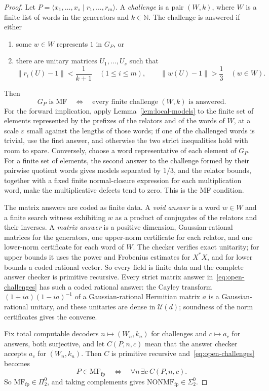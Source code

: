 \documentclass[11pt]{amsart}
\theoremstyle{remark}
\theoremstyle{plain}
\newcommand{\U}{\mathcal U}
\newcommand{\opnorm}[1]{\left\lVert #1\right\rVert}
\begin{document}
\begin{proof}
Let $P=\langle x_1,\dots,x_s\mid r_1,\dots,r_m\rangle$.  A
\emph{challenge} is a pair $(W,k)$, where $W$ is a finite list of words in
the generators and $k\in\mathbb N$.  The challenge is answered if
either
\begin{enumerate}
\item some $w\in W$ represents $1$ in $G_P$, or
\item there are unitary matrices $U_1,\dots,U_s$ such that
\[
  \opnorm{r_i(U)-1}<\frac1{k+1}\quad(1\le i\le m),
  \qquad
  \opnorm{w(U)-1}>\frac13\quad(w\in W).
\]
\end{enumerate}
Then
\begin{equation}\label{eq:open-challenges}
  G_P\text{ is MF}
  \quad\Longleftrightarrow\quad
  \text{every finite challenge $(W,k)$ is answered}.
\end{equation}
For the forward implication, apply Lemma~\ref{lem:local-models} to the
finite set of elements represented by the prefixes of the relators and of
the words of $W$, at a scale $\varepsilon$ small against the lengths of
those words; if one of the challenged words is trivial, use the first
answer, and otherwise the two strict inequalities hold with room to spare.
Conversely, choose a word representative of each element of $G_P$.  For a
finite set of elements, the second answer to the challenge formed by their
pairwise quotient words gives models separated by $1/3$, and the relator
bounds, together with a fixed finite normal-closure expression for each
multiplication word, make the multiplicative defects tend to zero.  This
is the MF condition.

The matrix answers are coded as finite data.  A \emph{void answer} is a
word $w\in W$ and a finite search witness exhibiting $w$ as a product of
conjugates of the relators and their inverses.  A \emph{matrix answer} is
a positive dimension, Gaussian-rational matrices for the generators, one
upper-norm certificate for each relator, and one lower-norm certificate for
each word of $W$.  The checker verifies exact unitarity; for upper bounds it
uses the power and Frobenius estimates for $X^*X$, and for lower bounds a
coded rational vector.  So every field is finite data and the complete
answer checker is primitive recursive.  Every strict matrix answer
in~\eqref{eq:open-challenges} has such a coded rational answer: the Cayley
transform $(1+ia)(1-ia)^{-1}$ of a Gaussian-rational Hermitian matrix $a$ is
a Gaussian-rational unitary, and these unitaries are dense in $\U(d)$;
soundness of the norm certificates gives the converse.

Fix total computable decoders $n\mapsto(W_n,k_n)$ for challenges and
$c\mapsto a_c$ for answers, both surjective, and let $C(P,n,c)$ mean that
the answer checker accepts $a_c$ for $(W_n,k_n)$.  Then $C$ is primitive
recursive and~\eqref{eq:open-challenges} becomes
\[
  P\in\mathrm{MF}_{\mathrm{fp}}
  \quad\Longleftrightarrow\quad
  \forall n\,\exists c\ C(P,n,c).
\]
So $\mathrm{MF}_{\mathrm{fp}}\in\Pi^0_2$, and taking complements gives
$\mathrm{NONMF}_{\mathrm{fp}}\in\Sigma^0_2$.
\end{proof}
\end{document}
